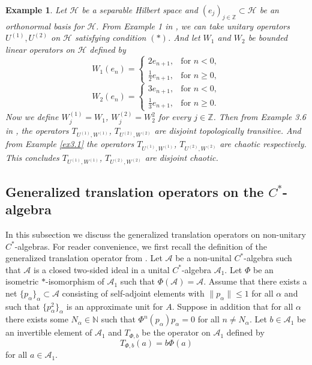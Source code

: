 \documentclass{article}
\newtheorem {example}[theorem]{Example}
\begin{document}
\begin{example}\textnormal{
Let $\mathcal{H}$ be a separable Hilbert space and $(e_{j})_{j\in\mathbb{Z}}\subset\mathcal{H}$ be an orthonormal basis for $\mathcal{H}$. From Example 1 in \cite{IT21}, we can take unitary operators $U^{(1)},U^{(2)}$ on $\mathcal{H}$ satisfying condition $(\ast)$.
And let $W_{1}$ and $W_{2}$ be bounded linear operators on $\mathcal{H}$ defined by}
\begin{displaymath}
W_{1}(e_{n})=\left\{ \begin{array}{ll}
2e_{n+1}, & \textrm{for } n<0,\\
\frac{1}{2}e_{n+1}, & \textrm{for } n\geq 0,
\end{array} \right.
\end{displaymath}
\begin{displaymath}
W_{2}(e_{n})=\left\{ \begin{array}{ll}
3e_{n+1}, & \textrm{for } n<0,\\
\frac{1}{3}e_{n+1}, & \textrm{for } n\geq 0.
\end{array} \right.
\end{displaymath}
\textnormal{
Now we define $W^{(1)}_{j}=W_{1}$, $W^{(2)}_{j}=W^{2}_{2}$ for every $j\in \mathbb{Z}$.
Then from Example 3.6 in \cite{RJ26}, the operators $T_{U^{(1)},W^{(1)}}$, $T_{U^{(2)},W^{(2)}}$ are disjoint topologically transitive. And from Example \ref{ex3.1} the operators $T_{U^{(1)},W^{(1)}}$, $T_{U^{(2)},W^{(2)}}$ are chaotic respectively.
This concludes $T_{U^{(1)},W^{(1)}}$, $T_{U^{(2)},W^{(2)}}$ are disjoint chaotic.
}
\end{example}

\subsection{Generalized translation operators on the $C^{\ast}$-algebra}
In this subsection we discuss the generalized translation operators on non-unitary $C^{\ast}$-algebras. For reader convenience, we first recall the definition of the generalized translation operator from \cite{I24}.
Let $\mathcal{A}$ be a non-unital $C^{\ast}$-algebra such that $\mathcal{A}$ is a closed two-sided ideal in a unital $C^{\ast}$-algebra $\mathcal{A}_{1}$. Let $\Phi$ be an isometric $\ast$-isomorphism of $\mathcal{A}_{1}$ such that $\Phi(\mathcal{A})=\mathcal{A}$. Assume that there exists a net $\{p_{\alpha}\}_{\alpha}\subset\mathcal{A}$ consisting of self-adjoint elements with $\|p_{\alpha}\|\leq 1$ for all $\alpha$ and such that $\{p^{2}_{\alpha}\}_{\alpha}$ is an approximate unit for $A$. Suppose in addition that for all $\alpha$ there exists some $N_{\alpha}\in\mathbb{N}$ such that $\Phi^{n}(p_{\alpha})p_{\alpha}=0$ for all $n\neq N_{\alpha}$. Let $b\in \mathcal{A}_{1}$ be an invertible element of $\mathcal{A}_{1}$ and $T_{\Phi, b}$ be the operator on $\mathcal{A}_{1}$ defined by 
\[T_{\Phi,b}(a)=b\Phi(a)\] 
for all $a\in \mathcal{A}_{1}$.
\end{document}
